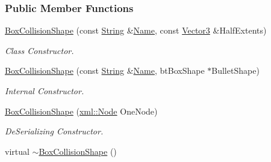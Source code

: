 \subsubsection*{Public Member Functions}
\begin{DoxyCompactItemize}
\item 
\hyperlink{classMezzanine_1_1BoxCollisionShape_afcf359b8683bd158040963eca43ac670}{BoxCollisionShape} (const \hyperlink{namespaceMezzanine_acf9fcc130e6ebf08e3d8491aebcf1c86}{String} \&\hyperlink{classMezzanine_1_1CollisionShape_aac524c5c56fa4d158bc071f8aecfbe79}{Name}, const \hyperlink{classMezzanine_1_1Vector3}{Vector3} \&HalfExtents)
\begin{DoxyCompactList}\small\item\em Class Constructor. \item\end{DoxyCompactList}\item 
\hyperlink{classMezzanine_1_1BoxCollisionShape_ae715de5cb9f343f10973f06bf4f9acbb}{BoxCollisionShape} (const \hyperlink{namespaceMezzanine_acf9fcc130e6ebf08e3d8491aebcf1c86}{String} \&\hyperlink{classMezzanine_1_1CollisionShape_aac524c5c56fa4d158bc071f8aecfbe79}{Name}, btBoxShape $\ast$BulletShape)
\begin{DoxyCompactList}\small\item\em Internal Constructor. \item\end{DoxyCompactList}\item 
\hyperlink{classMezzanine_1_1BoxCollisionShape_a20fe1b0eef928087c30fbb90bf718e97}{BoxCollisionShape} (\hyperlink{classMezzanine_1_1xml_1_1Node}{xml::Node} OneNode)
\begin{DoxyCompactList}\small\item\em DeSerializing Constructor. \item\end{DoxyCompactList}\item 
\hypertarget{classMezzanine_1_1BoxCollisionShape_a3698d2ef0c9a0ab92809b2ff2ba62792}{
virtual \hyperlink{classMezzanine_1_1BoxCollisionShape_a3698d2ef0c9a0ab92809b2ff2ba62792}{$\sim$BoxCollisionShape} ()}
\label{classMezzanine_1_1BoxCollisionShape_a3698d2ef0c9a0ab92809b2ff2ba62792}


\end{DoxyCompactItemize}
